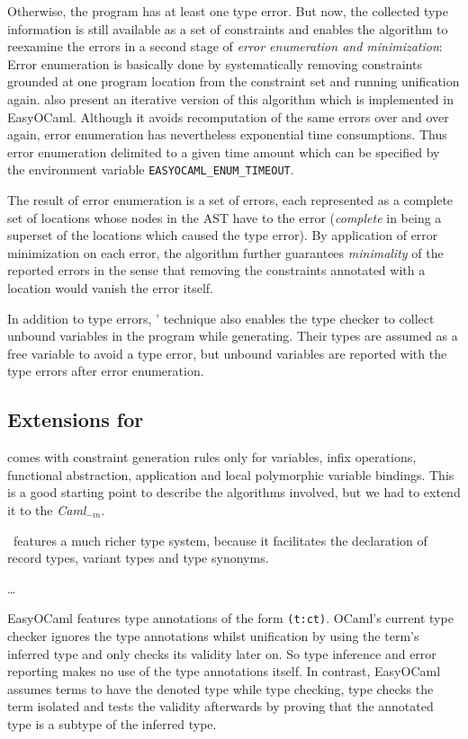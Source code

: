 Otherwise, the program has at least one type error. But now, the 
collected type information is still available as a set of constraints 
and enables the algorithm to reexamine the errors in a second stage of 
\emph{error enumeration and minimization}: Error enumeration is 
basically done by systematically removing constraints grounded at one 
program location from the constraint set and running unification again.
\citet{haackwells04} also present an iterative version of this algorithm which
is implemented in EasyOCaml. Although it avoids recomputation of the same
errors over and over again, error enumeration has nevertheless exponential time
consumptions. Thus error enumeration delimited to a given time amount which can
be specified by the environment variable \texttt{EASYOCAML\_ENUM\_TIMEOUT}.

The result of error enumeration is a set of errors, each represented as a
complete set of locations whose nodes in the AST have to the error
(\emph{complete} in being a superset of the locations which caused the type
error). By application of error minimization on each error, the algorithm
further guarantees \emph{minimality} of the reported errors in the sense that
removing the constraints annotated with a location would vanish the error
itself.

In addition to type errors, \citeauthor{haackwells04}' technique also enables the 
type checker to collect unbound variables in the program while 
generating. Their types are assumed as a free variable to avoid a type 
error, but unbound variables are reported with the type errors after 
error enumeration.


\subsection{Extensions for \easyocaml}
\label{hd002002}
\citet{haackwells04} comes with constraint generation rules only for variables,
infix operations, functional abstraction, application and local polymorphic
variable bindings. This is a good starting point to describe the algorithms
involved, but we had to extend it to the \emph{Caml}$_{-m}$.

\new \easyocaml\ features a much richer type system, because it facilitates the
declaration of record types, variant types and type synonyms.

\dots

EasyOCaml features type annotations of the form \texttt{(t:ct)}. OCaml's
current type checker ignores the type annotations whilst unification by using
the term's inferred type and only checks its validity later on.
So type inference and error reporting makes no use of the type annotations
itself.
In contrast, EasyOCaml assumes terms to have the denoted type while type
checking, type checks the term isolated and tests the validity afterwards by
proving that the annotated type is a subtype of the inferred type.

